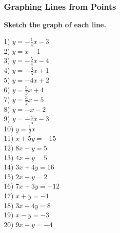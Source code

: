 \documentclass[12pt]{book}
\theoremstyle{definition}
\begin{document}
\subsubsection*{Graphing Lines from Points}
{\bf Sketch the graph of each line.}
\begin{multicols}{4}
  1) $y = - \frac{1}{4} x - 3$\\
  2) $y = x - 1$\\
  3) $y = - \frac{5}{4} x - 4$\\
  4) $y = - \frac{3}{5} x + 1$\\
  5) $y = - 4 x + 2$\\
  6) $y = \frac{5}{3} x + 4$\\
  7) $y = \frac{3}{2} x - 5$\\
  8) $y = - x - 2$\\
  9) $y = - \frac{4}{5} x - 3$\\
  10) $y = \frac{1}{2} x$\\
  11) $x + 5 y = - 15$\\
  12) $8 x - y = 5$\\
  13) $4 x + y = 5$\\
  14) $3 x + 4 y = 16$\\
  15) $2 x - y = 2$\\
  16) $7 x + 3 y = - 12$\\
  17) $x + y = - 1$\\
  18) $3 x + 4 y = 8$\\
  19) $x - y = - 3$\\
  20) $9 x - y = - 4$
\end{multicols}
\end{document}
